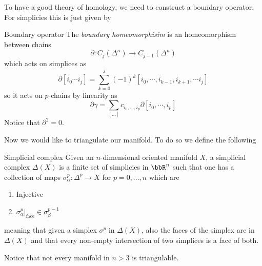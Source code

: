 \documentclass[11pt]{article}
\theoremstyle{definition}
\numberwithin{equation}{section}
\begin{document}
To have a good theory of homology, we need to construct a boundary operator. For simplicies this is just given by 
\begin{defn}{Boundary operator}{}
	The \textit{boundary homeomorphisim} is an homeomorphism between chains
	\begin{equation}
		\partial:C_{j}(\Delta^{n})\rightarrow C_{j-1}(\Delta^{n})
	\end{equation}
	which acts on simplices as
	\begin{equation}
		\partial[i_{0}\cdots i_{j}]=\sum_{k=0}^{j}(-1)^{k}[i_{0},\cdots,i_{k-1},i_{k+1},\cdots i_{j}]
	\end{equation}
	so it acts on $p$-chains by linearity as
	\begin{equation}
		\partial\gamma=\sum_{[\ldots]}c_{i_{0},\ldots,i_{p}}\partial[i_{0},\cdots,i_{p}]
	\end{equation}
	Notice that $\partial^{2}=0$.
\end{defn}
Now we would like to triangulate our manifold. To do so we define the following
\begin{defn}{Simplicial complex}{}
	Given an $n$-dimensional oriented manifold $X$, a simplicial complex $\Delta (X)$ is a finite set of simplicies in $\bbR^{n}$ such that one has a collection of maps $\sigma_{\alpha}^{p}:\Delta^{p}\rightarrow X$ for $p=0,\ldots,n$ which are
	\begin{enumerate}
	\item Injective
	\item $\sigma_{\alpha}^{p}\Big |_{\text{face}}\in \sigma^{p-1}_{\beta}$
	\end{enumerate}
meaning that given a simplex $\sigma^{p}$ in $\Delta(X)$, also the faces of the simplex are in $\Delta(X)$ and that every non-empty intersection of two simplices is a face of both.
\end{defn}
Notice that not every manifold in $n>3$ is triangulable.\\
\end{document}
